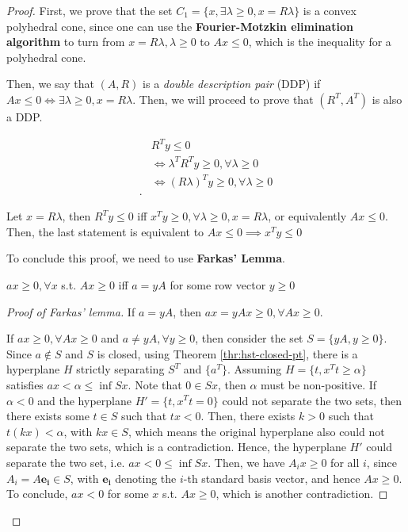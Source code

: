 \begin{proof}
  First, we prove that the set \( C_{1} = \{ x, \exists \lambda \ge 0, x =
  R\lambda\}   \) is a convex polyhedral cone, since one can use the
  \textbf{Fourier-Motzkin elimination algorithm} to turn from \( x = R\lambda,
  \lambda \ge 0 \) to \( Ax \le  0 \), which is the inequality for a polyhedral
  cone.

  Then, we say that \( (A, R) \) is a \textit{double description pair} (DDP) if
  \( Ax \le  0 \iff \exists \lambda \ge 0, x = R\lambda  \). Then, we will
  proceed to prove that \( (R^{T}, A^{T}) \) is also a DDP.

  \begin{align*}
    &R^{T}y \le 0\\
    &\iff \lambda^{T} R^{T} y \ge 0, \forall  \lambda \ge 0\\
    &\iff (R\lambda)^{T} y \ge 0, \forall  \lambda \ge 0\\
  .\end{align*}

  Let \( x = R\lambda \), then \( R^{T}y \le 0 \) iff \( x^{T}y \ge 0, \forall
  \lambda \ge 0, x = R\lambda \), or equivalently \( Ax \le  0 \). Then, the
  last statement is equivalent to \( Ax \le  0 \implies x^{T}y \le  0 \)

  To conclude this proof, we need to use \textbf{Farkas' Lemma}.

  \begin{lemma}
  \label{farkas}
    \( ax \ge  0, \forall  x \) s.t. \( Ax \ge  0 \) iff \( a = yA \) for some
    row vector \( y \ge  0 \)
  \end{lemma}

  \begin{proof}[Proof of Farkas' lemma]
    If \( a = yA \), then \( ax = yAx \ge  0, \forall  Ax \ge 0 \).

    If \( ax \ge  0, \forall Ax \ge 0 \) and \( a \neq  yA, \forall  y\ge 0 \),
    then consider the set \( S = \{yA, y \ge 0\}   \). Since \( a \notin S \)
    and \( S \) is closed, using Theorem \ref{thr:hst-closed-pt}, there is a
    hyperplane \( H \) strictly separating \( S^{T} \) and \( \{ a^{T}\}   \).
    Assuming \( H = \{t, x^{T}t \ge  \alpha\}   \) satisfies \( ax  <  \alpha
    \le   \inf Sx \). Note that \( 0 \in Sx \), then \( \alpha \) must be
    non-positive. If \( \alpha < 0 \) and the hyperplane \( H' = \{ t, x^{T}t =
    0\}   \) could not separate the two sets, then there exists some \( t \in S
    \) such that \( tx < 0 \). Then, there exists \( k > 0 \) such that \( t(kx)
    < \alpha\), with \( kx \in S \), which means the original hyperplane also could
    not separate the two sets, which is a contradiction. Hence, the hyperplane
    \( H' \) could separate the two set, i.e. \( ax < 0 \le \inf Sx \). Then,
    we have \( A_{i}x \ge  0 \) for all \( i \), since \( A_{i} =
    A\mathbf{e_{i}} \in S \), with \( \mathbf{e_{i}} \) denoting the \( i \)-th
    standard basis vector, and hence \( Ax \ge 0 \). To conclude, \( ax < 0 \)
    for some \( x \) s.t. \( Ax \ge 0 \), which is another contradiction.
  \end{proof}


\end{proof}
